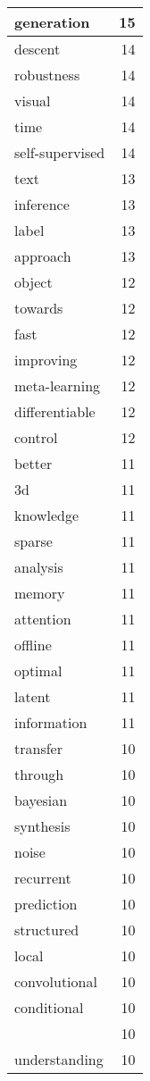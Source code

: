 \begin{table}[h]
\begin{tabular}{|l|r|}
\hline
generation & 15 \\
\hline
descent & 14 \\
\hline
robustness & 14 \\
\hline
visual & 14 \\
\hline
time & 14 \\
\hline
self-supervised & 14 \\
\hline
text & 13 \\
\hline
inference & 13 \\
\hline
label & 13 \\
\hline
approach & 13 \\
\hline
object & 12 \\
\hline
towards & 12 \\
\hline
fast & 12 \\
\hline
improving & 12 \\
\hline
meta-learning & 12 \\
\hline
differentiable & 12 \\
\hline
control & 12 \\
\hline
better & 11 \\
\hline
3d & 11 \\
\hline
knowledge & 11 \\
\hline
sparse & 11 \\
\hline
analysis & 11 \\
\hline
memory & 11 \\
\hline
attention & 11 \\
\hline
offline & 11 \\
\hline
optimal & 11 \\
\hline
latent & 11 \\
\hline
information & 11 \\
\hline
transfer & 10 \\
\hline
through & 10 \\
\hline
bayesian & 10 \\
\hline
synthesis & 10 \\
\hline
noise & 10 \\
\hline
recurrent & 10 \\
\hline
prediction & 10 \\
\hline
structured & 10 \\
\hline
local & 10 \\
\hline
convolutional & 10 \\
\hline
conditional & 10 \\
\hline
 & 10 \\
\hline
understanding & 10 \\

\end{tabular}
\end{table}
